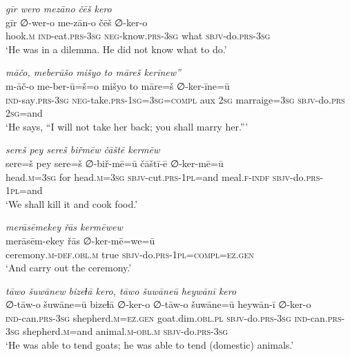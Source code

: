 \ea \label{ZP.111}
\textit{gīr wero mezāno čēš kero} \\ 
\gll gīr ∅-wer-o me-zān-o čēš ∅-ker-o \\ 
 hook\textsc{.m} \textsc{ind-}eat\textsc{.prs}\textsc{-3sg} \textsc{neg-}know\textsc{.prs}\textsc{-3sg} what \textsc{sbjv-}do\textsc{.prs}\textsc{-3sg} \\ 
\glt `He was in a dilemma. He did not know what to do.'
\z 
 
\ea \label{ZP.116}
\textit{māčo, meberūšo mišyo to māreš kerīnew”} \\ 
\gll m-āč-o me-ber-ū=š=o mišyo to māre=š ∅-ker-īne=ū \\ 
 \textsc{ind-}say\textsc{.prs}\textsc{-3sg} \textsc{neg-}take\textsc{.prs}\textsc{-\textsc{1sg}}\textsc{=3sg}\textsc{=compl} aux \textsc{2sg} marraige\textsc{=3sg} \textsc{sbjv-}do\textsc{.prs} \textsc{2sg}=and \\ 
\glt `He says, “I will not take her back; you shall marry her.”'
\z 
 
\ea \label{ZP.122}
\textit{sereš pey sereš biřmēw čāštē kermēw} \\ 
\gll sere=š pey sere=š ∅-biř-mē=ū čāštī-ē ∅-ker-mē=ū \\ 
 head\textsc{.m}\textsc{=3sg} for head\textsc{.m}\textsc{=3sg} \textsc{sbjv-}cut\textsc{.prs}\textsc{-1pl}=and meal\textsc{.f}\textsc{-indf} \textsc{sbjv-}do\textsc{.prs}\textsc{-1pl}=and \\ 
\glt `We shall kill it and cook food.'
\z 
 
\ea \label{ZP.123}
\textit{merāsēmekey řās kermēwew} \\ 
\gll merāsēm-ekey řās ∅-ker-mē=we=ū \\ 
 ceremony\textsc{.m}\textsc{-def}\textsc{.obl}\textsc{.m} true \textsc{sbjv-}do\textsc{.prs}\textsc{-1pl}\textsc{=compl}\textsc{\textsc{=ez.gen}} \\ 
\glt `And carry out the ceremony.'
\z 
 
\ea \label{ŽP.16}
\textit{tāwo šuwānew bizeɫā kero, tāwo šuwāneū heywānī kero} \\ 
\gll ∅-tāw-o šuwāne=ū bizeɫā ∅-ker-o ∅-tāw-o šuwāne=ū heywān-ī ∅-ker-o \\ 
 \textsc{ind-}can\textsc{.prs}\textsc{-3sg} shepherd\textsc{.m}\textsc{\textsc{=ez.gen}} goat.dim\textsc{.obl}\textsc{.pl} \textsc{sbjv-}do\textsc{.prs}\textsc{-3sg} \textsc{ind-}can\textsc{.prs}\textsc{-3sg} shepherd\textsc{.m}=and animal\textsc{.m}\textsc{-obl}\textsc{.m} \textsc{sbjv-}do\textsc{.prs}\textsc{-3sg} \\ 
\glt `He was able to tend goats; he was able to tend (domestic) animals.'
\z 
 
